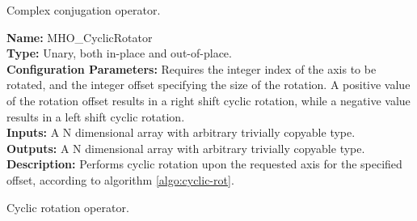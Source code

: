 \begin{algorithm}[h!]
  \caption{Complex conjugation operator.}
    \begin{algorithmic}[1]
    \end{algorithmic}
  \label{algo:complex-conjugator}
\end{algorithm}


\noindent \textbf{Name:} MHO\_CyclicRotator \\
\textbf{Type:} Unary, both in-place and out-of-place. \\
\textbf{Configuration Parameters:} Requires the integer index of the axis to be rotated, and the integer offset specifying the size of the rotation. A positive value of the rotation offset results in a right shift cyclic rotation, while a negative value results in a left shift cyclic rotation.\\
\textbf{Inputs:} A N dimensional array with arbitrary trivially copyable type. \\
\textbf{Outputs:} A N dimensional array with arbitrary trivially copyable type. \\
\textbf{Description:} Performs cyclic rotation upon the requested axis for the specified offset, according to algorithm \ref{algo:cyclic-rot}.

\begin{algorithm}[h!]
  \caption{Cyclic rotation operator.}
    \begin{algorithmic}[1]
    \end{algorithmic}
  \label{algo:cyclic-rot}
\end{algorithm}



